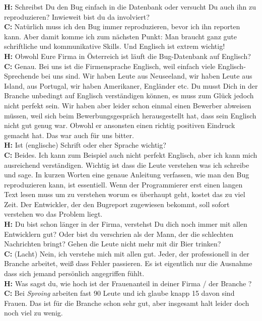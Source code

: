 \documentclass[10pt,a4paper,ngerman,twoside]{article} %
\begin{document}
\begin{multicols}{3}
\textbf{H:} Schreibst Du den Bug einfach in die Datenbank oder versucht Du auch ihn zu reproduzieren? Inwieweit bist du da involviert? \\
\textbf{C:} Natürlich muss ich den Bug immer reproduzieren, bevor ich ihn reporten kann. Aber damit komme ich zum nächsten Punkt: Man braucht ganz gute schriftliche und kommunikative Skills. Und Englisch ist extrem wichtig! \\
\textbf{H:} Obwohl Eure Firma in Österreich ist läuft die Bug-Datenbank auf Englisch?  \\
\textbf{C:} Genau. Bei uns ist die Firmensprache Englisch, weil einfach viele Englisch-Sprechende bei uns sind. Wir haben Leute aus Neuseeland, wir haben Leute aus Island, aus Portugal, wir haben Amerikaner, Engländer etc. Du musst Dich in der Branche unbedingt auf Englisch verständigen können, es muss zum Glück jedoch nicht perfekt sein. Wir haben aber leider schon einmal einen Bewerber abweisen müssen, weil sich beim Bewerbungsgespräch herausgestellt hat, dass sein Englisch nicht gut genug war. Obwohl er ansonsten einen richtig positiven Eindruck gemacht hat. Das war auch für uns bitter. \\
\textbf{H:} Ist (englische) Schrift oder eher Sprache wichtig? \\
\textbf{C:} Beides. Ich kann zum Beispiel auch nicht perfekt Englisch, aber ich kann mich ausreichend verständigen. Wichtig ist dass die Leute verstehen was ich schreibe und sage. In kurzen Worten eine genaue Anleitung verfassen, wie man den Bug reproduzieren kann, ist essentiell. Wenn der Programmierer erst einen langen Text lesen muss um zu verstehen worum es überhaupt geht, kostet das zu viel Zeit. Der Entwickler, der den Bugreport zugewiesen bekommt, soll sofort verstehen wo das Problem liegt. \\
\textbf{H:} Du bist schon länger in der Firma, verstehst Du dich noch immer mit allen Entwicklern gut? Oder bist du verschrien als der Mann, der die schlechten Nachrichten bringt? Gehen die Leute nicht mehr mit dir Bier trinken? \\
\textbf{C:} (Lacht) Nein, ich verstehe mich mit allen gut. Jeder, der professionell in der Branche arbeitet, weiß dass Fehler passieren. Es ist eigentlich nur die Ausnahme dass sich jemand persönlich angegriffen fühlt. \\
\textbf{H:} Was sagst du, wie hoch ist der Frauenanteil in deiner Firma / der Branche ? \\
\textbf{C:} Bei \textit{Sproing} arbeiten fast 90 Leute und ich glaube knapp 15 davon sind Frauen. Das ist für die Branche schon sehr gut, aber insgesamt halt leider doch noch viel zu wenig. \\

\end{multicols}
\end{document}
